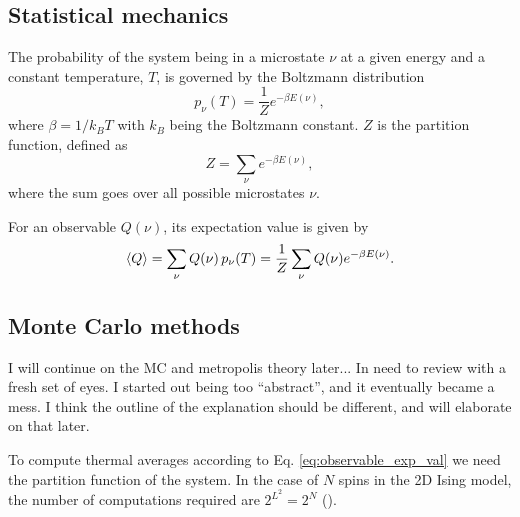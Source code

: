 \subsection{Statistical mechanics}\label{subsec_theory:statistical_mechanics}

The probability of the system being in a microstate $\nu$ at a given energy and a constant temperature, $T$, is governed by the Boltzmann distribution 
\begin{equation}\label{eq:boltzmann_distr}
    p_\nu (T) = \frac{1}{Z}e^{-\beta E(\nu)},
\end{equation} 
where $\beta=1/k_B T$ with $k_B$ being the Boltzmann constant. $Z$ is the partition function, defined as 
\begin{equation}\label{eq:partition_function}
    Z = \sum_\nu e^{-\beta E(\nu)},
\end{equation}  
where the sum goes over all possible microstates $\nu$. 

For an observable $Q(\nu)$, its expectation value is given by 
\begin{equation}\label{eq:observable_exp_val}
    \expval{Q} = \sum_{\nu} Q(\nu)\, p_\nu(T) = \frac{1}{Z} \sum_\nu Q(\nu) e^{-\beta E(\nu)}.
\end{equation}


\subsection{Monte Carlo methods} \label{subsec_theory:MC_methods}
\alert{I will continue on the MC and metropolis theory later... In need to review with a fresh set of eyes. I started out being too ``abstract'', and it eventually became a mess. I think the outline of the explanation should be different, and will elaborate on that later.}



To compute thermal averages according to Eq. \eqref{eq:observable_exp_val} we need the partition function of the system. In the case of $N$ spins in the 2D Ising model, the number of computations required are $2^{L^2}=2^N$ ().  

